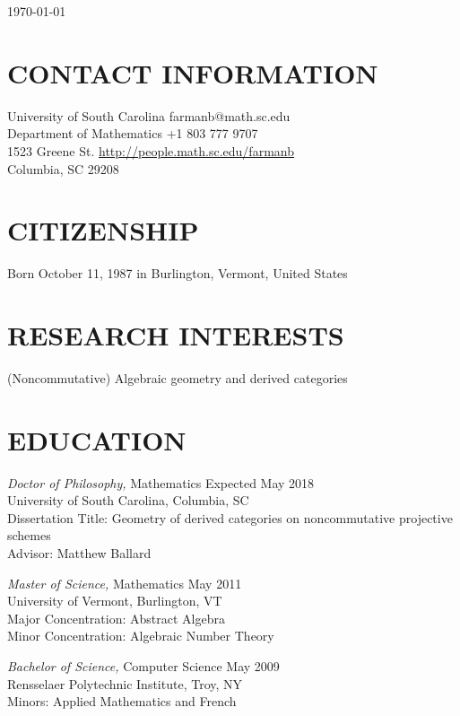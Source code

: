 \documentclass[line,overlapped]{res}
\begin{document}
\hfill \today

\begin{resume}

  \section{CONTACT INFORMATION}
  University of South Carolina \hfill farmanb@math.sc.edu\\
  Department of Mathematics \hfill +1 803 777 9707\\
  1523 Greene St. \hfill \hyperref[http://people.math.sc.edu/farmanb]{http://people.math.sc.edu/farmanb}\\
  Columbia, SC 29208

  \section{CITIZENSHIP}
  Born October 11, 1987 in Burlington, Vermont, United States

  \section{RESEARCH INTERESTS}
  (Noncommutative) Algebraic geometry and derived categories
  \section{EDUCATION} 
  \textsl{Doctor of Philosophy,} Mathematics \hfill Expected May 2018\\
  University of South Carolina, Columbia, SC\\
  Dissertation Title: Geometry of derived categories on noncommutative projective schemes\\
  Advisor: Matthew Ballard

  \textsl{Master of Science,} Mathematics \hfill May 2011\\
  University of Vermont, Burlington, VT\\
  Major Concentration: Abstract Algebra\\
  Minor Concentration: Algebraic Number Theory

  \textsl{Bachelor of Science,} Computer Science \hfill May 2009\\
  Rensselaer Polytechnic Institute, Troy, NY\\
  Minors: Applied Mathematics and French
  

\end{resume}
\end{document}
